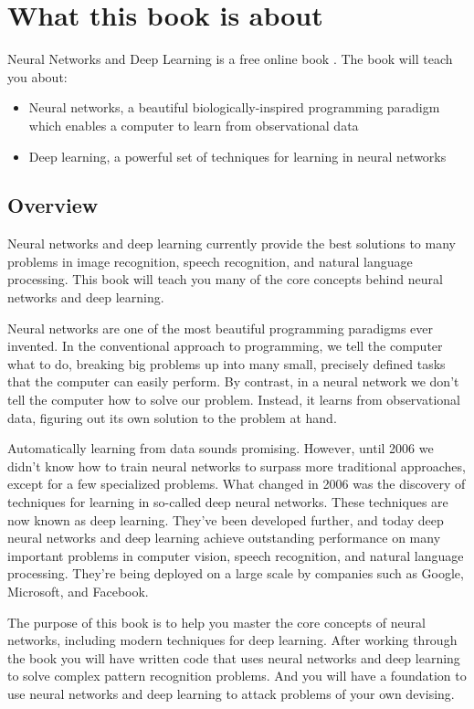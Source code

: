 
\chapter*{What this book is about}


Neural Networks and Deep Learning is a free online book \cite{Nielsen2015}. The book will teach you about: 
\begin{itemize}
\item  Neural networks, a beautiful biologically-inspired programming paradigm which enables a computer to learn from observational data 
\item Deep learning, a powerful set of techniques for learning in neural networks 
\end{itemize}

\section*{Overview}

Neural networks and deep learning currently provide the best solutions to many problems in image recognition, speech recognition, and natural language processing. This book will teach you many of the core concepts behind neural networks and deep learning. 

Neural networks are one of the most beautiful programming paradigms ever invented. In the conventional approach to programming, we tell the computer what to do, breaking big problems up into many small, precisely defined tasks that the computer can easily perform. By contrast, in a neural network we don't tell the computer how to solve our problem. Instead, it learns from observational data, figuring out its own solution to the problem at hand.

Automatically learning from data sounds promising. However, until 2006 we didn't know how to train neural networks to surpass more traditional approaches, except for a few specialized problems. What changed in 2006 was the discovery of techniques for learning in so-called deep neural networks. These techniques are now known as deep learning. They've been developed further, and today deep neural networks and deep learning achieve outstanding performance on many important problems in computer vision, speech recognition, and natural language processing. They're being deployed on a large scale by companies such as Google, Microsoft, and Facebook.

The purpose of this book is to help you master the core concepts of neural networks, including modern techniques for deep learning. After working through the book you will have written code that uses neural networks and deep learning to solve complex pattern recognition problems. And you will have a foundation to use neural networks and deep learning to attack problems of your own devising.

